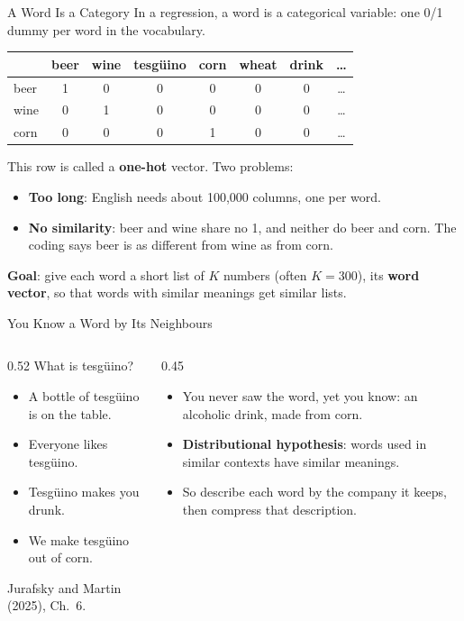 \documentclass[aspectratio=169,11pt,xcolor=dvipsnames]{beamer}
\newcommand{\core}{\,\raisebox{0.6pt}{\textcolor{corestar}{$\bigstar$}}}
\begin{document}
\begin{frame}{A Word Is a Category}
In a regression, a word is a categorical variable: one 0/1 dummy per word in the vocabulary.
\begin{center}\small
\renewcommand{\arraystretch}{1.05}
\begin{tabular}{@{}lccccccc@{}}
\toprule
& beer & wine & tesg\"uino & corn & wheat & drink & \dots \\
\midrule
beer & 1 & 0 & 0 & 0 & 0 & 0 & \dots \\
wine & 0 & 1 & 0 & 0 & 0 & 0 & \dots \\
corn & 0 & 0 & 0 & 1 & 0 & 0 & \dots \\
\bottomrule
\end{tabular}
\end{center}
This row is called a \textbf{one-hot} vector. Two problems:
\begin{itemize}\itemsep3pt
  \item \textbf{Too long}: English needs about 100,000 columns, one per word.
  \item \textbf{No similarity}: beer and wine share no 1, and neither do beer and corn. The coding
        says beer is as different from wine as from corn.
\end{itemize}
\vskip3pt
\textbf{Goal}: give each word a short list of $K$ numbers (often $K = 300$), its \textbf{word vector},
so that words with similar meanings get similar lists.
\end{frame}

\begin{frame}{You Know a Word by Its Neighbours\core}
\begin{columns}[T]
\begin{column}{0.52\linewidth}
What is \textcolor{dukeblue}{tesg\"uino}?
\vskip3pt
\begin{itemize}\itemsep3pt
  \item A bottle of \textcolor{dukeblue}{tesg\"uino} is on the table.
  \item Everyone likes \textcolor{dukeblue}{tesg\"uino}.
  \item \textcolor{dukeblue}{Tesg\"uino} makes you drunk.
  \item We make \textcolor{dukeblue}{tesg\"uino} out of corn.
\end{itemize}
\vskip3pt
{\footnotesize Jurafsky and Martin (2025), Ch.\ 6.}
\end{column}
\begin{column}{0.45\linewidth}
\begin{itemize}\itemsep4pt
  \item You never saw the word, yet you know: an alcoholic drink, made from corn.
  \item \textbf{Distributional hypothesis}: words used in similar contexts have similar
        meanings.
  \item So describe each word by the company it keeps, then compress that description.
\end{itemize}
\end{column}
\end{columns}
\end{frame}
\end{document}

